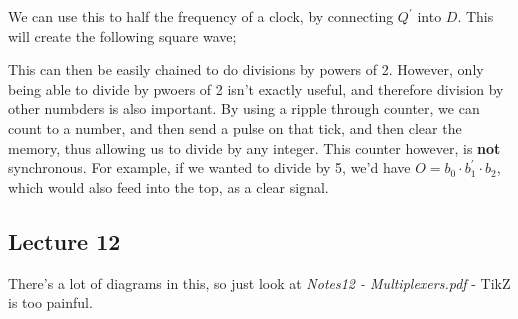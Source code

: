 \documentclass[a4paper, 12pt]{article}
\begin{document}
            We can use this to half the frequency of a clock, by connecting $Q^\prime$ into $D$. This will create the following square wave;
            \begin{center}
            \end{center}
            This can then be easily chained to do divisions by powers of 2. However, only being able to divide by pwoers of 2 isn't exactly useful, and therefore division by other numbders is also important. By using a ripple through counter, we can count to a number, and then send a pulse on that tick, and then clear the memory, thus allowing us to divide by any integer. This counter however, is \textbf{not} synchronous. For example, if we wanted to divide by 5, we'd have $O = b_0 \cdot b_1^\prime \cdot b_2$, which would also feed into the top, as a clear signal.
            \begin{center}
            \end{center}
        \subsection*{Lecture 12}
            There's a lot of diagrams in this, so just look at \textit{Notes12 - Multiplexers.pdf} - TikZ is too painful.
            \medskip
\end{document}
